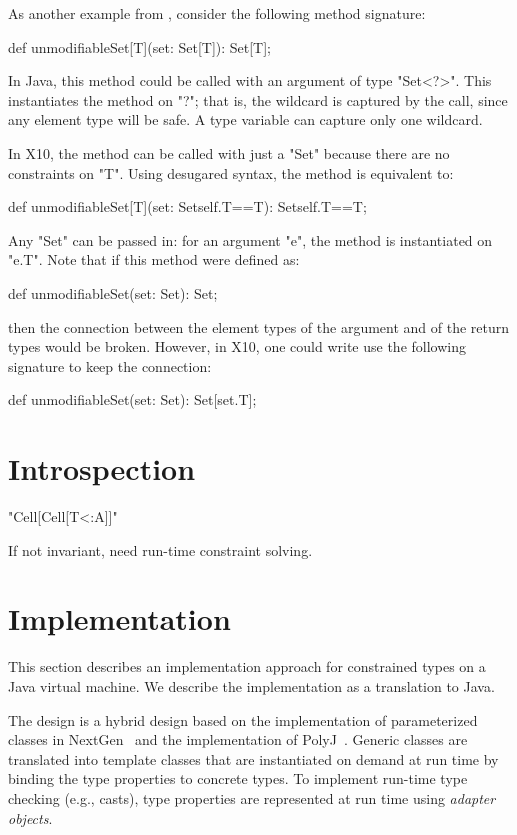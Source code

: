 \documentclass[preprint,nocopyrightspace,9pt]{sigplanconf}
\begin{document}
As another example from \cite{adding-wildcards}, consider
the following method signature:
\begin{xten}
def unmodifiableSet[T](set: Set[T]): Set[T];
\end{xten}

In Java, this method could be called with an argument of
type \xcd"Set<?>".
This instantiates the method on \xcd"?"; that is, the
wildcard is captured by the call, since any element type will be
safe.  A type variable can capture only one wildcard.

In X10, the method can be called with just a \xcd"Set" because there
are no constraints on \xcd"T".  Using desugared syntax, the method is
equivalent to:
\begin{xten}
def unmodifiableSet[T](set: Set{self.T==T}): Set{self.T==T};
\end{xten}
Any \xcd"Set" can be passed in: for an argument \xcd"e", the method
is instantiated on \xcd"e.T".
%
Note that if this method were defined as:
\begin{xten}
def unmodifiableSet(set: Set): Set;
\end{xten}
then the connection between the element types of the
argument and of the return types would be broken.
However, in X10, one could write use the following signature to keep the
connection:
\begin{xten}
def unmodifiableSet(set: Set): Set[set.T];
\end{xten}

\section{Introspection}

\xcd"Cell[Cell[T<:A]]"

If not invariant, need run-time constraint solving.
\fi

\section{Implementation}

This section describes an implementation approach for
constrained types on a Java virtual machine.
We describe the implementation as a translation to Java.

The design
is a hybrid design based on the implementation of parameterized classes in
NextGen~\cite{allen03,allen04} and the implementation of
PolyJ~\cite{polyj}.
Generic classes are translated into template classes
that are instantiated on demand at run time by binding the type properties
to concrete types.  To implement run-time type checking (e.g.,
casts), type properties are represented at run time
using \emph{adapter objects}.
\end{document}

